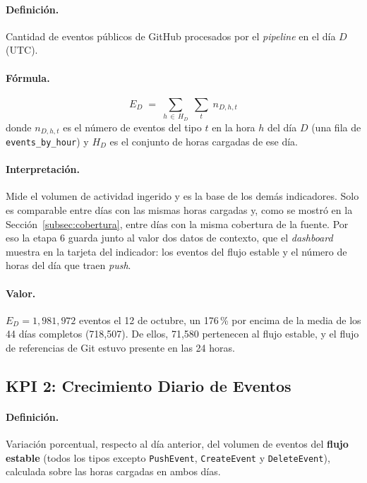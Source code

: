 \paragraph{Definición.} Cantidad de eventos públicos de GitHub procesados por el \textit{pipeline} en el día $D$ (UTC).

\paragraph{Fórmula.}
\[
E_D \;=\; \sum_{h \,\in\, H_D} \; \sum_{t} \; n_{D,h,t}
\]
donde $n_{D,h,t}$ es el número de eventos del tipo $t$ en la hora $h$ del día $D$ (una fila de \texttt{events\_by\_hour}) y $H_D$ es el conjunto de horas cargadas de ese día.

\paragraph{Interpretación.} Mide el volumen de actividad ingerido y es la base de los demás indicadores. Solo es comparable entre días con las mismas horas cargadas y, como se mostró en la Sección~\ref{subsec:cobertura}, entre días con la misma cobertura de la fuente. Por eso la etapa 6 guarda junto al valor dos datos de contexto, que el \textit{dashboard} muestra en la tarjeta del indicador: los eventos del flujo estable y el número de horas del día que traen \textit{push}.

\paragraph{Valor.} $E_D = 1{,}981{,}972$ eventos el 12 de octubre, un 176\,\% por encima de la media de los 44 días completos (718,507). De ellos, 71,580 pertenecen al flujo estable, y el flujo de referencias de Git estuvo presente en las 24 horas.


\subsection{KPI 2: Crecimiento Diario de Eventos}

\paragraph{Definición.} Variación porcentual, respecto al día anterior, del volumen de eventos del \textbf{flujo estable} (todos los tipos excepto \texttt{PushEvent}, \texttt{CreateEvent} y \texttt{DeleteEvent}), calculada sobre las horas cargadas en ambos días.

